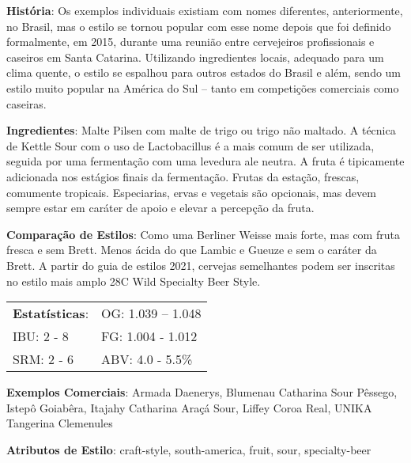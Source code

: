 \textbf{História}: Os exemplos individuais existiam com nomes diferentes, anteriormente, no Brasil, mas o estilo se tornou popular com esse nome depois que foi definido formalmente, em 2015, durante uma reunião entre cervejeiros profissionais e caseiros em Santa Catarina. Utilizando ingredientes locais, adequado para um clima quente, o estilo se espalhou para outros estados do Brasil e além, sendo um estilo muito popular na América do Sul – tanto em competições comerciais como caseiras.

\textbf{Ingredientes}: Malte Pilsen com malte de trigo ou trigo não maltado. A técnica de Kettle Sour com o uso de Lactobacillus é a mais comum de ser utilizada, seguida por uma fermentação com uma levedura ale neutra. A fruta é tipicamente adicionada nos estágios finais da fermentação. Frutas da estação, frescas, comumente tropicais. Especiarias, ervas e vegetais são opcionais, mas devem sempre estar em caráter de apoio e elevar a percepção da fruta.

\textbf{Comparação de Estilos}: Como uma Berliner Weisse mais forte, mas com fruta fresca e sem Brett. Menos ácida do que Lambic e Gueuze e sem o caráter da Brett. A partir do guia de estilos 2021, cervejas semelhantes podem ser inscritas no estilo mais amplo 28C Wild Specialty Beer Style.

\begin{tabular}{@{}p{35mm}p{35mm}@{}}
  \textbf{Estatísticas}: & OG: 1.039 – 1.048\\
  IBU: 2 - 8 & FG: 1.004 - 1.012 \\
  SRM: 2 - 6  & ABV: 4.0 - 5.5\%
\end{tabular}

\textbf{Exemplos Comerciais}: Armada Daenerys, Blumenau Catharina Sour Pêssego, Istepô Goiabêra, Itajahy Catharina Araçá Sour, Liffey Coroa Real, UNIKA Tangerina Clemenules

\textbf{Atributos de Estilo}: craft-style, south-america, fruit, sour, specialty-beer
